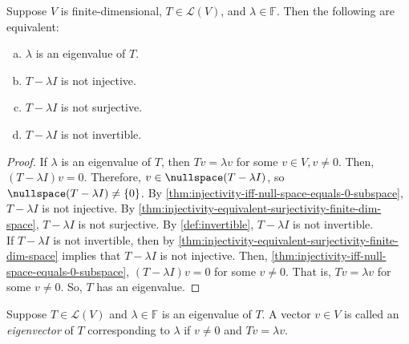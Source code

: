 \documentclass{article}
\begin{document}
\begin{theorem}
  \label{thm:equivalent-conditions-to-be-an-eigenvalue}
  Suppose $V$ is finite-dimensional, $T \in \mathcal{L}(V)$, and
  $\lambda \in \mathbb{F}$. Then the following are equivalent:
  \begin{enumerate}[(a)]
  \item
    $\lambda$ is an eigenvalue of $T$.
  \item
    $T - \lambda I$ is not injective.
  \item
    $T - \lambda I$ is not surjective.
  \item
    $T - \lambda I$ is not invertible.
  \end{enumerate}
\end{theorem}
\begin{proof}
  If $\lambda$ is an eigenvalue of $T$, then $Tv = \lambda v$ for some
  $v \in V, v \ne 0$. Then, $(T - \lambda I) v = 0$. Therefore, $v \in
  \nullspace (T - \lambda I)$, so $\nullspace (T - \lambda I) \ne
  \{0\}$. By \cref{thm:injectivity-iff-null-space-equals-0-subspace},
  $T - \lambda I$ is not injective. By
  \cref{thm:injectivity-equivalent-surjectivity-finite-dim-space}, $T
  - \lambda I$ is not surjective. By \cref{def:invertible}, $T -
  \lambda I$ is not invertible. \\
  If $T - \lambda I$ is not invertible, then by
  \cref{thm:injectivity-equivalent-surjectivity-finite-dim-space}
  implies that $T - \lambda I$ is not injective. Then,
  \cref{thm:injectivity-iff-null-space-equals-0-subspace}, $(T -
  \lambda I) v = 0$ for some $v \ne 0$. That is, $Tv = \lambda v$ for
  some $v \ne 0$. So, $T$ has an eigenvalue.
\end{proof}

\begin{definition}[eigenvector]
  \label{def:eigenvector}
  Suppose $T \in \mathcal{L}(V)$ and $\lambda \in \mathbb{F}$ is an
  eigenvalue of $T$. A vector $v \in V$ is called an
  \textit{eigenvector} of $T$ corresponding to $\lambda$ if $v \ne
  0$ and $Tv = \lambda v$.
\end{definition}
\end{document}
